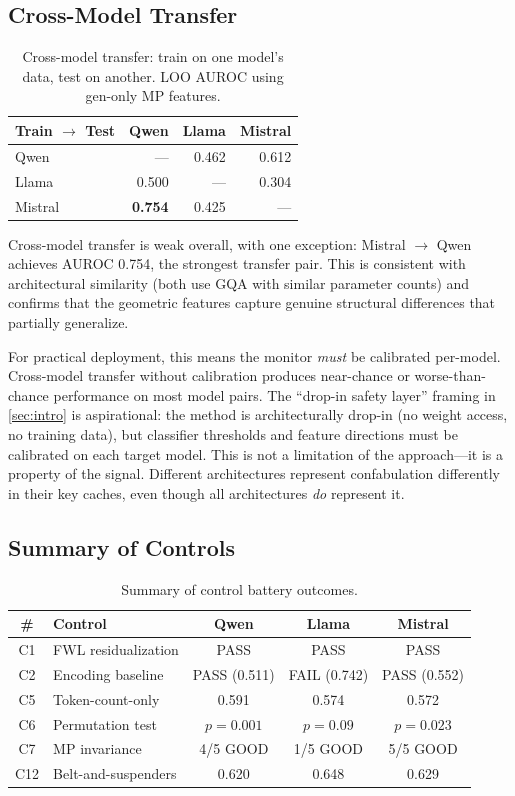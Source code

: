 \subsection{Cross-Model Transfer}

\begin{table}[H]
\centering
\caption{Cross-model transfer: train on one model's data, test on another.
  LOO AUROC using gen-only MP features.}
\label{tab:transfer}
\begin{tabular}{lrrr}
\toprule
Train $\to$ Test & Qwen & Llama & Mistral \\
\midrule
Qwen    & --- & 0.462 & 0.612 \\
Llama   & 0.500 & --- & 0.304 \\
Mistral & \textbf{0.754} & 0.425 & --- \\
\bottomrule
\end{tabular}
\end{table}

Cross-model transfer is weak overall, with one exception:
Mistral $\to$ Qwen achieves AUROC 0.754, the strongest transfer pair.
This is consistent with architectural similarity (both use GQA with
similar parameter counts) and confirms that the geometric features
capture genuine structural differences that partially generalize.

For practical deployment, this means the monitor \emph{must} be
calibrated per-model. Cross-model transfer without calibration produces
near-chance or worse-than-chance performance on most model pairs. The
``drop-in safety layer'' framing in \cref{sec:intro} is aspirational:
the method is architecturally drop-in (no weight access, no training
data), but classifier thresholds and feature directions must be
calibrated on each target model. This is not a limitation of the
approach---it is a property of the signal. Different architectures
represent confabulation differently in their key caches, even though
all architectures \emph{do} represent it.

\subsection{Summary of Controls}

\begin{table}[H]
\centering
\caption{Summary of control battery outcomes.}
\label{tab:control_summary}
\begin{tabular}{clccc}
\toprule
\# & Control & Qwen & Llama & Mistral \\
\midrule
C1 & FWL residualization & PASS & PASS & PASS \\
C2 & Encoding baseline & PASS (0.511) & FAIL (0.742) & PASS (0.552) \\
C5 & Token-count-only & 0.591 & 0.574 & 0.572 \\
C6 & Permutation test & $p{=}0.001$ & $p{=}0.09$ & $p{=}0.023$ \\
C7 & MP invariance & 4/5 GOOD & 1/5 GOOD & 5/5 GOOD \\
C12 & Belt-and-suspenders & 0.620 & 0.648 & 0.629 \\
\bottomrule
\end{tabular}
\end{table}

